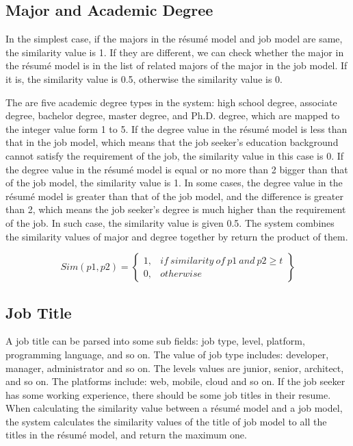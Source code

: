 \subsection{Major and Academic Degree}

In the simplest case, if the majors in the r\'esum\'e model and job model are same, the similarity value is 1. If they are different, we can check whether the major in the r\'esum\'e model is in the list of related majors of the major in the job model. If it is, the similarity value is 0.5, otherwise the similarity value is 0.

The are five academic degree types in the system:  high school degree, associate degree, bachelor degree, master degree, and Ph.D. degree, which are mapped to the integer value form 1 to 5. If the degree value in the r\'esum\'e model is less than that in the job model, which means that the job seeker's education background cannot satisfy the requirement of the job, the similarity value in this case is 0. If the degree value in the r\'esum\'e model is equal or no more than 2 bigger than that of the job model, the similarity value is 1. In some cases, the degree value in the r\'esum\'e model is greater than that of the job model, and the difference is greater than 2, which means the job seeker's degree is much higher than the requirement of the job. In such case, the similarity value is given 0.5. The system combines the similarity values of major and degree together by return the product of them.

$$ Sim(p1, p2) = \begin{Bmatrix}
1, & if~similarity~of~p1~and~p2 \geqslant t\\
0, & otherwise
\end{Bmatrix} $$

\subsection{Job Title}

A job title can be parsed into some sub fields: job type, level, platform, programming language, and so on.  The value of job type includes: developer, manager, administrator and so on. The levels values are junior, senior, architect, and so on. The platforms include: web, mobile, cloud and so on. If the job seeker has some working experience, there should be some job titles in their resume.  When calculating the similarity value between a r\'esum\'e model and a job model, the system calculates the similarity values of the title of job model to all the titles in the r\'esum\'e model, and return the maximum one.


